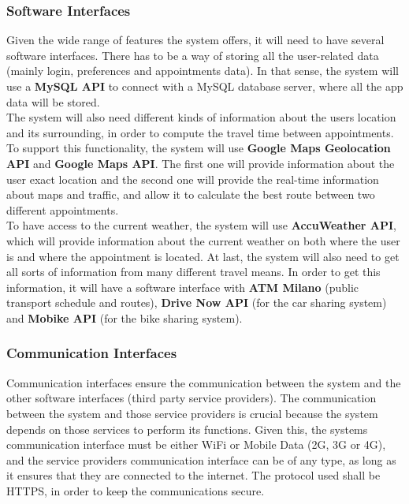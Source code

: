 \documentclass[12pt]{article}
\begin{document}
\subsubsection{Software Interfaces}
Given the wide range of features the system offers, it will need to have several software interfaces. There has to be a way of storing all the user-related data (mainly login, preferences and appointments data). In that sense, the system will use a \textbf{MySQL API} to connect with a MySQL database server, where all the app data will be stored.\\
The system will also need different kinds of information about the users location and its surrounding, in order to compute the travel time between appointments. To support this functionality, the system will use \textbf{Google Maps Geolocation API} and \textbf{Google Maps API}. The first one will provide information about the user exact location and the second one will provide the real-time information about maps and traffic, and allow it to calculate the best route between two different appointments.\\
To have access to the current weather, the system will use \textbf{AccuWeather API}, which will provide information about the current weather on both where the user is and where the appointment is located.
At last, the system will also need to get all sorts of information from many different travel means. In order to get this information, it will have a software interface with \textbf{ATM Milano} (public transport schedule and routes), \textbf{Drive Now API} (for the car sharing system) and \textbf{Mobike API} (for the bike sharing system).



\subsubsection{Communication Interfaces}
Communication interfaces ensure the communication between the system and the other software interfaces (third party service providers).
The communication between the system and those service providers is crucial because the system depends on those services to perform its functions. Given this, the systems communication interface must be either WiFi or Mobile Data (2G, 3G or 4G), and the service providers communication interface can be of any type, as long as it ensures that they are connected to the internet. The protocol used shall be HTTPS, in order to keep the communications secure.
\end{document}
